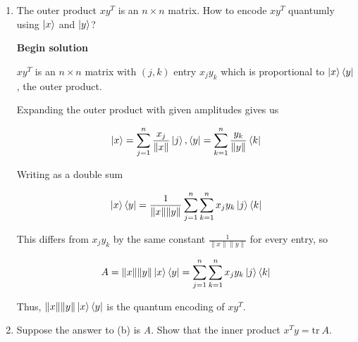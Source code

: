 \documentclass[11pt]{article}
\begin{document}
\begin{enumerate}
\begin{enumerate}
		            Multiply the norm by both sides

		            \begin{equation*}
			            \|x\|\|y\| \braket{x|y} =  \frac{\sum_{i=1}^n x_i y_i}{\|x\| \|y\|} \cdot \|x\|\|y\|
		            \end{equation*}

		            The norm cancel out on the right side and we are left with

		            \begin{equation*}
			            \braket{x|y} = \sum_i^n x_iy_i = x^Ty
		            \end{equation*}

		      \item The outer product $xy^T$ is an $n \times n$ matrix. How to encode $xy^T$ quantumly using $\ket{x}$ and $\ket{y}$?

		            \textbf{Begin solution}

		            $xy^T$ is an $n \times n$ matrix with $(j,k)$ entry $x_j y_k$ which is proportional to  $\ket{x}\bra{y}$, the outer product.

		            Expanding the outer product with given amplitudes gives us

		            \begin{equation*}
			            \ket{x} = \sum_{j=1}^n \frac{x_j}{\|x\|} \ket{j}, \bra{y} = \sum_{k=1}^n \frac{y_k}{\|y\|} \bra{k}
		            \end{equation*}

		            Writing as a double sum

		            \begin{equation*}
			            \ket{x}\bra{y} = \frac{1}{\|x\|\|y\|} \sum_{j=1}^n \sum_{k=1}^n x_j y_k \ket{j}\bra{k}
		            \end{equation*}

		            This differs from $x_j y_k$ by the same constant $\frac{1}{\|x\| \|y\|}$ for every entry, so

		            \begin{equation*}
			            A = \|x\| \|y\| \ket{x} \bra{y} = \sum_{j=1}^n \sum_{k=1}^n x_j y_k \ket{j}\bra{k}
		            \end{equation*}

		            Thus, $\|x\| \|y\| \ket{x}\bra{y}$ is the quantum encoding of $xy^T$.

		      \item Suppose the answer to (b) is \textit{A}. Show that the inner product $x^Ty = \text{tr} \ A$.


\end{enumerate}
\end{enumerate}
\end{document}
